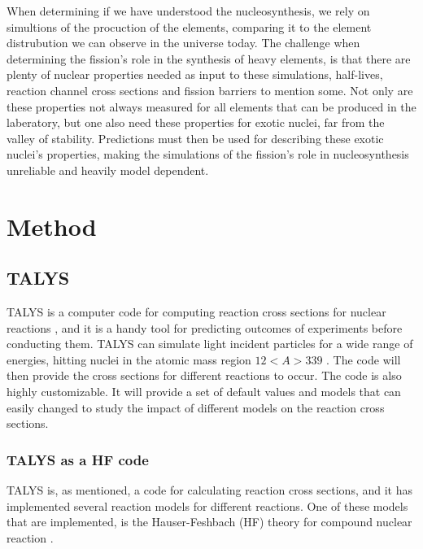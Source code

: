 \documentclass[]{article}
\begin{document}
\par 
\vspace{3mm}

 \noindent When determining if we have understood the nucleosynthesis, we rely on simultions of the procuction of the elements, comparing it to the element distrubution we can observe in the universe today.  The challenge when determining the fission's role in the synthesis of heavy elements, is that there are plenty of nuclear properties needed as input to these simulations, half-lives, reaction channel cross sections and fission barriers to mention some. Not only are these properties not always measured for all elements that can be produced in the laberatory, but one also need these properties for exotic nuclei, far from the valley of stability. Predictions must then be used for describing these exotic nuclei's properties, making the simulations of the fission's role in nucleosynthesis unreliable and heavily model dependent. 

\section{Method}

\subsection{TALYS}

TALYS is a computer code for computing reaction cross sections for nuclear reactions \cite{TALYSmanual}, and it is a handy tool for predicting outcomes of experiments before conducting them. TALYS can simulate light incident particles for a wide range of energies, hitting nuclei in the atomic mass region $12<A>339$ \cite{TALYSmanual}. The code will then provide the cross sections for different reactions to occur. The code is also highly customizable. It will provide a set of default values and models that can easily changed to study the impact of different models on the reaction cross sections.

\subsubsection{TALYS as a HF code}
TALYS is, as mentioned, a code for calculating reaction cross sections, and it has implemented several reaction models for different reactions. One of these models that are implemented, is the Hauser-Feshbach (HF) theory for compound nuclear reaction \cite{TALYSweb}. 
\par 
\vspace{3mm}
\end{document}

